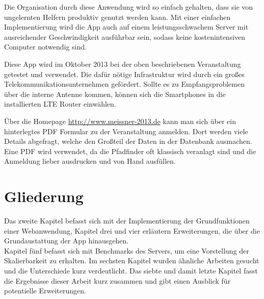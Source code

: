 Die Organisation durch diese Anwendung wird so einfach gehalten, dass sie von ungelernten Helfern produktiv genutzt werden kann. Mit einer einfachen Implementierung wird die App auch auf einem leistungsschwachem Server mit ausreichender Geschwindigkeit ausführbar sein, sodass keine kostenintensiven Computer notwendig sind.\par

Diese App wird im Oktober 2013 bei der oben beschriebenen Veranstaltung getestet und verwendet. Die dafür nötige Infrastruktur wird durch ein großes Telekommunikationsunternehmen gefördert. Sollte es zu Empfangsproblemen über die interne Antenne kommen, können sich die Smartphones in die installierten LTE Router einwählen.\par

Über die Homepage \url{http://www.meissner-2013.de} kann man sich über ein hinterlegtes PDF Formular zu der Veranstaltung anmelden. Dort werden viele Details abgefragt, welche den Großteil der Daten in der Datenbank ausmachen. Eine PDF wird verwendet, da die Pfadfinder oft klassisch veranlagt sind und die Anmeldung lieber ausdrucken und von Hand ausfüllen.

\section{Gliederung}
Das zweite Kapitel befasst sich mit der Implementierung der Grundfunktionen einer Webanwendung, Kapitel drei und vier erläutern Erweiterungen, die über die Grundaustattung der App hinausgehen.\\
Kapitel fünf befasst sich mit Benchmarks des Servers, um eine Vorstellung der Skalierbarkeit zu erhalten. Im sechsten Kapitel wurden ähnliche Arbeiten gesucht und die Unterschiede kurz verdeutlicht. Das siebte und damit letzte Kapitel fasst die Ergebnisse dieser Arbeit kurz zusammen und gibt einen Ausblick für potentielle Erweiterungen. 